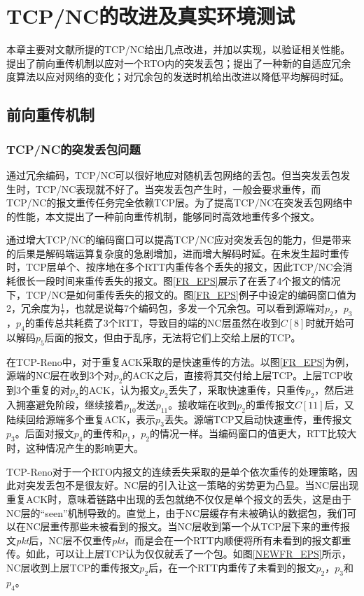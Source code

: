 \chapter{TCP/NC的改进及真实环境测试}
本章主要对文献\cite{Sundararajan2009}所提的TCP/NC给出几点改进，并加以实现，以验证相关性能。提出了前向重传机制以应对一个RTO内的突发丢包；提出了一种新的自适应冗余度算法以应对网络的变化；对冗余包的发送时机给出改进以降低平均解码时延。
\section{前向重传机制}
\subsection{TCP/NC的突发丢包问题}
通过冗余编码，TCP/NC可以很好地应对随机丢包网络的丢包。但当突发丢包发生时，TCP/NC表现就不好了。当突发丢包产生时，一般会要求重传，而TCP/NC的报文重传任务完全依赖TCP层。为了提高TCP/NC在突发丢包网络中的性能，本文提出了一种前向重传机制，能够同时高效地重传多个报文。
\par
通过增大TCP/NC的编码窗口可以提高TCP/NC应对突发丢包的能力，但是带来的后果是解码端运算复杂度的急剧增加，进而增大解码时延。在未发生超时重传时，TCP层单个、按序地在多个RTT内重传各个丢失的报文，因此TCP/NC会消耗很长一段时间来重传丢失的报文。图\ref{FR_EPS}展示了在丢了4个报文的情况下，TCP/NC是如何重传丢失的报文的。图\ref{FR_EPS}例子中设定的编码窗口值为2，冗余度为$\frac{1}{7}$，也就是说每7个编码包，多发一个冗余包。可以看到源端对$p_2$，$p_3$，$p_4$的重传总共耗费了3个RTT，导致目的端的NC层虽然在收到$C\left[8\right]$时就开始可以解码$p_5$后面的报文，但由于乱序，无法将它们上交给上层的TCP。
\par
在TCP-Reno中，对于重复ACK采取的是快速重传的方法。以图\ref{FR_EPS}为例，源端的NC层在收到3个对$p_2$的ACK之后，直接将其交付给上层TCP。上层TCP收到3个重复的对$p_2$的ACK，认为报文$p_2$丢失了，采取快速重传，只重传$p_2$，然后进入拥塞避免阶段，继续接着$p_{10}$发送$p_{11}$。接收端在收到$p_2$的重传报文$C\left[11\right]$后，又陆续回给源端多个重复ACK，表示$p_3$丢失。源端TCP又启动快速重传，重传报文$p_3$。后面对报文$p_4$的重传和$p_1$，$p_2$的情况一样。当编码窗口的值更大，RTT比较大时，这种情况产生的影响更大。
\par
TCP-Reno对于一个RTO内报文的连续丢失采取的是单个依次重传的处理策略，因此对突发丢包不是很友好。NC层的引入让这一策略的劣势更为凸显。当NC层出现重复ACK时，意味着链路中出现的丢包就绝不仅仅是单个报文的丢失，这是由于NC层的“seen”机制导致的。直觉上，由于NC层缓存有未被确认的数据包，我们可以在NC层重传那些未被看到的报文。当NC层收到第一个从TCP层下来的重传报文\emph{pkt}后，NC层不仅重传\emph{pkt}，而是会在一个RTT内顺便将所有未看到的报文都重传。如此，可以让上层TCP认为仅仅就丢了一个包。如图\ref{NEWFR_EPS}所示，NC层收到上层TCP的重传报文$p_2$后，在一个RTT内重传了未看到的报文$p_2$，$p_3$和$p_4$。
